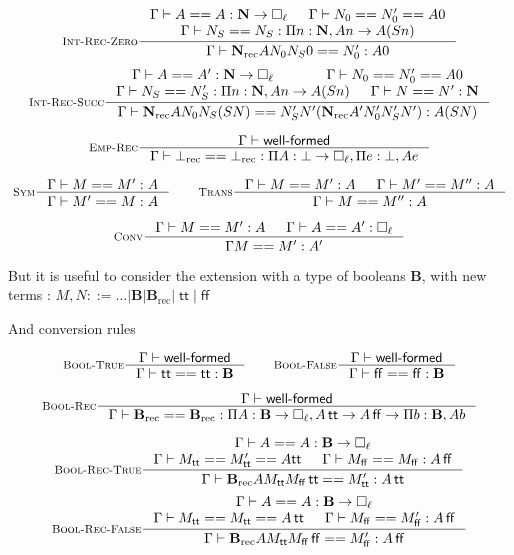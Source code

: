 \documentclass[11pt]{article}
\DeclareMathOperator{\rec}{rec}
\DeclareMathOperator{\true}{\mathsf{tt}}
\DeclareMathOperator{\false}{\mathsf{ff}}
\newcommand{\0}{\mathbf{0}}
\newcommand{\1}{\mathbf{1}}
\newcommand{\nat}{\mathbf{N}}
\newcommand{\bool}{\mathbf{B}}
\newcommand{\tctx}{\Gamma}
\newcommand{\Wf}{\textsf{well-formed}}
\begin{document}
$$
    \inference[\textsc{Int-Rec-Zero}]{\tctx |- A == A : \nat -> \square_\ell & \tctx |- N_0 == N'_0 == A 0\\ \tctx |- N_S == N_S : \Pi n:\nat, A n -> A(S n)}{\tctx |- \nat_{\rec} A N_0N_S0 == N'_0 : A 0}
$$
$$
    \inference[\textsc{Int-Rec-Succ}]{\tctx |- A == A' : \nat -> \square_\ell & \tctx |- N_0 == N'_0 == A 0\\ \tctx |- N_S == N'_S : \Pi n:\nat, A n -> A(S n) & \tctx |- N == N' :\nat}{\tctx |- \nat_{\rec} A N_0N_S (S N) == N'_S N' (\nat_{\rec}A' N'_0 N'_S N') : A (S N)}
$$


$$
    \inference[\textsc{Emp-Rec}]{\tctx |- \Wf}{\tctx |- \bot_{\rec} == \bot_{\rec} : \Pi A : \bot \to \square_\ell,\Pi e :\bot, A e}
$$

$$
    \inference[\textsc{Sym}]{\tctx |- M == M' : A}{\tctx |- M' == M : A} \qquad
    \inference[\textsc{Trans}]
    {\tctx |- M == M' :A & \tctx |- M' == M'' : A}{\tctx |- M == M'' : A}
$$

$$
    \inference[\textsc{Conv}]
    {\tctx |- M == M' :A & \tctx |- A == A' : \square_\ell}{\tctx M ==M' : A'}
$$

But it is useful to consider the extension with a type of booleans $\bool$, with new terms :
 $ M,N ::= \dots | \bool|\bool_{\rec}|\true|\false$

 And conversion rules

$$
    \inference[\textsc{Bool-True}]{\tctx |- \Wf}{\tctx |- \true == \true : \bool} \qquad
    \inference[\textsc{Bool-False}]{\tctx |- \Wf}{\tctx |- \false == \false : \bool}
$$

$$
    \inference[\textsc{Bool-Rec}]{\tctx |- \Wf}{\tctx |- \bool_{\rec} == \bool_{\rec} : \Pi A : \bool \to \square_\ell, A \true \to A\false \to \Pi b :\bool, A b}
$$


$$
    \inference[\textsc{Bool-Rec-True}]{\tctx |- A == A : \bool -> \square_\ell \\ \tctx |- M_{\true} == M'_{\true} == A {\true} & \tctx |- M_{\false} == M_{\false} : A \false}{\tctx |- \bool_{\rec} A M_{\true} M_{\false} \true == M'_{\true} : A \true}
$$
$$
    \inference[\textsc{Bool-Rec-False}]{\tctx |- A == A : \bool -> \square_\ell \\ \tctx |- M_{\true} == M_{\true} == A \true & \tctx |- M_{\false} == M'_{\false} : A \false}{\tctx |- \bool_{\rec} A M_{\true} M_{\false} \false == M'_{\false} : A \false}
$$

\end{document}
